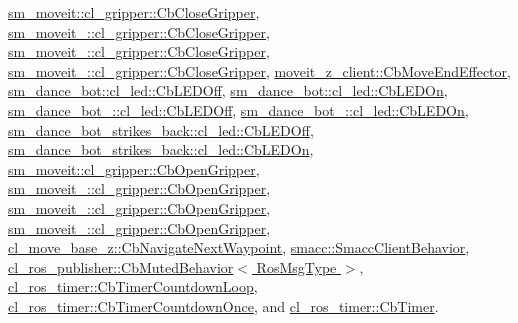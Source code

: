 \hyperlink{classsm__moveit_1_1cl__gripper_1_1CbCloseGripper_a643cca41b7a62a3c2b26e07ab7edb05a}{sm\+\_\+moveit\+::cl\+\_\+gripper\+::\+Cb\+Close\+Gripper}, \hyperlink{classsm__moveit__2_1_1cl__gripper_1_1CbCloseGripper_a6dfd0cf0abefda948c23767508cd8d86}{sm\+\_\+moveit\+\_\+::cl\+\_\+gripper\+::\+Cb\+Close\+Gripper}, \hyperlink{classsm__moveit__3_1_1cl__gripper_1_1CbCloseGripper_ad78af2da289e83bd9a7087bc31b14ecb}{sm\+\_\+moveit\+\_\+::cl\+\_\+gripper\+::\+Cb\+Close\+Gripper}, \hyperlink{classsm__moveit__4_1_1cl__gripper_1_1CbCloseGripper_a9c907d899c60fff004eb9f2d5e29913b}{sm\+\_\+moveit\+\_\+::cl\+\_\+gripper\+::\+Cb\+Close\+Gripper}, \hyperlink{classmoveit__z__client_1_1CbMoveEndEffector_af3fdc6c596da7792cfc9bbef13cb02fc}{moveit\+\_\+z\+\_\+client\+::\+Cb\+Move\+End\+Effector}, \hyperlink{classsm__dance__bot_1_1cl__led_1_1CbLEDOff_ad0db28985308dd486943d1f511c655ad}{sm\+\_\+dance\+\_\+bot\+::cl\+\_\+led\+::\+Cb\+L\+E\+D\+Off}, \hyperlink{classsm__dance__bot_1_1cl__led_1_1CbLEDOn_a60a82058c585b4d0398b531c1e1bdf0b}{sm\+\_\+dance\+\_\+bot\+::cl\+\_\+led\+::\+Cb\+L\+E\+D\+On}, \hyperlink{classsm__dance__bot__2_1_1cl__led_1_1CbLEDOff_a6ca7b3ba30347c4be33d3b4946009325}{sm\+\_\+dance\+\_\+bot\+\_\+::cl\+\_\+led\+::\+Cb\+L\+E\+D\+Off}, \hyperlink{classsm__dance__bot__2_1_1cl__led_1_1CbLEDOn_a461d3e1829d785ab490fce9827868e39}{sm\+\_\+dance\+\_\+bot\+\_\+::cl\+\_\+led\+::\+Cb\+L\+E\+D\+On}, \hyperlink{classsm__dance__bot__strikes__back_1_1cl__led_1_1CbLEDOff_a6b4ac6e1c516ced8515e6b6641c5d063}{sm\+\_\+dance\+\_\+bot\+\_\+strikes\+\_\+back\+::cl\+\_\+led\+::\+Cb\+L\+E\+D\+Off}, \hyperlink{classsm__dance__bot__strikes__back_1_1cl__led_1_1CbLEDOn_aadafa99cd7c683a9d1ae59b5158826d9}{sm\+\_\+dance\+\_\+bot\+\_\+strikes\+\_\+back\+::cl\+\_\+led\+::\+Cb\+L\+E\+D\+On}, \hyperlink{classsm__moveit_1_1cl__gripper_1_1CbOpenGripper_a16cdbe39be1b1789880bae04fa87531c}{sm\+\_\+moveit\+::cl\+\_\+gripper\+::\+Cb\+Open\+Gripper}, \hyperlink{classsm__moveit__2_1_1cl__gripper_1_1CbOpenGripper_ab72fa9429628aa78b2bb1276ff7d390a}{sm\+\_\+moveit\+\_\+::cl\+\_\+gripper\+::\+Cb\+Open\+Gripper}, \hyperlink{classsm__moveit__3_1_1cl__gripper_1_1CbOpenGripper_a91085c752bc1d9cfadd65031b8b64c46}{sm\+\_\+moveit\+\_\+::cl\+\_\+gripper\+::\+Cb\+Open\+Gripper}, \hyperlink{classsm__moveit__4_1_1cl__gripper_1_1CbOpenGripper_ab5355c50786f7f598ee6ca5650d56fbe}{sm\+\_\+moveit\+\_\+::cl\+\_\+gripper\+::\+Cb\+Open\+Gripper}, \hyperlink{classcl__move__base__z_1_1CbNavigateNextWaypoint_a1a848f7bfedd23fea7de59a940257b05}{cl\+\_\+move\+\_\+base\+\_\+z\+::\+Cb\+Navigate\+Next\+Waypoint}, \hyperlink{classsmacc_1_1SmaccClientBehavior_a7e4fb6ce81ff96dc172425852d69c0c5}{smacc\+::\+Smacc\+Client\+Behavior}, \hyperlink{classcl__ros__publisher_1_1CbMutedBehavior_a4c02187c58358fa811777d9956510222}{cl\+\_\+ros\+\_\+publisher\+::\+Cb\+Muted\+Behavior$<$ Ros\+Msg\+Type $>$}, \hyperlink{classcl__ros__timer_1_1CbTimerCountdownLoop_a5623e9fdd8f0fb23e8707f7816c099d6}{cl\+\_\+ros\+\_\+timer\+::\+Cb\+Timer\+Countdown\+Loop}, \hyperlink{classcl__ros__timer_1_1CbTimerCountdownOnce_ab602b778a299b42e8cc9f4bf3da0a234}{cl\+\_\+ros\+\_\+timer\+::\+Cb\+Timer\+Countdown\+Once}, and \hyperlink{classcl__ros__timer_1_1CbTimer_a04184e2679c32363c876e1d6b4746072}{cl\+\_\+ros\+\_\+timer\+::\+Cb\+Timer}.

